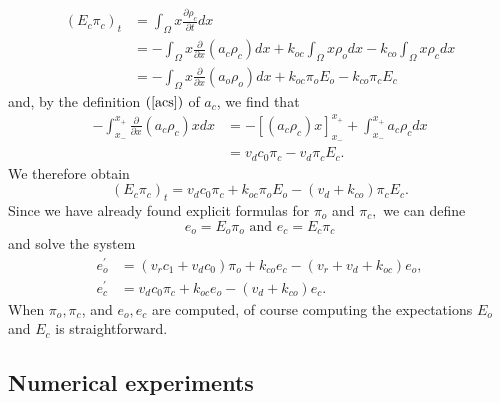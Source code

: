 \begin{align}
\left(  E_{c}\pi_{c}\right)  _{t}  & =\int_{\Omega}x\frac{\partial\rho_{c}%
}{\partial t}dx\\
& =-\int_{\Omega}x\frac{\partial}{\partial x}\left(  a_{c}\rho_{c}\right)
dx+k_{oc}\int_{\Omega}x\rho_{o}dx-k_{co}\int_{\Omega}x\rho_{c}dx\\
& =-\int_{\Omega}x\frac{\partial}{\partial x}\left(  a_{o}\rho_{o}\right)
dx+k_{oc}\pi_{o}E_{o}-k_{co}\pi_{c}E_{c}
\end{align}
and, by the definition $\left(  \ref{acs}\right)  $ of $a_{c}$, we find that%
\begin{align}
-\int_{x_{-}}^{x_{+}}\frac{\partial}{\partial x}\left(  a_{c}\rho_{c}\right)
xdx &  =-\left[  \left(  a_{c}\rho_{c}\right)  x\right]  _{x_{-}}^{x_{+}}%
+\int_{x_{-}}^{x_{+}}a_{c}\rho_{c}dx\\
&  =v_{d}c_{0}\pi_{c}-v_{d}\pi_{c}E_{c}.
\end{align}
We therefore obtain%
\begin{equation}
\left(  E_{c}\pi_{c}\right)  _{t}=v_{d}c_{0}\pi_{c}+k_{oc}\pi_{o}E_{o}-\left(
v_{d}+k_{co}\right)  \pi_{c}E_{c}.
\end{equation}
Since we have already found explicit formulas for $\pi_{o}$ and $\pi_{c},$ we
can define%
\begin{equation}
e_{o}=E_{o}\pi_{o}\text{ and }e_{c}=E_{c}\pi_{c} \label{eoec_def}
\end{equation}
and solve the system
\begin{align}
e_{o}^{\prime}  & =\left(  v_{r}c_{1}+v_{d}c_{0}\right)  \pi_{o}+k_{co}%
e_{c}-\left(  v_{r}+v_{d}+k_{oc}\right)  e_{o}, \label{eo33}\\
e_{c}^{\prime}  & =v_{d}c_{0}\pi_{c}+k_{oc}e_{o}-\left(  v_{d}+k_{co}\right)
e_{c}. \label{ec33}
\end{align}
When $\pi_{o},\pi_{c}$, and $e_{o},e_{c}$ are computed, of course computing 
the expectations $E_{o}$ and $E_{c}$ is straightforward.


\subsection{Numerical experiments} 

